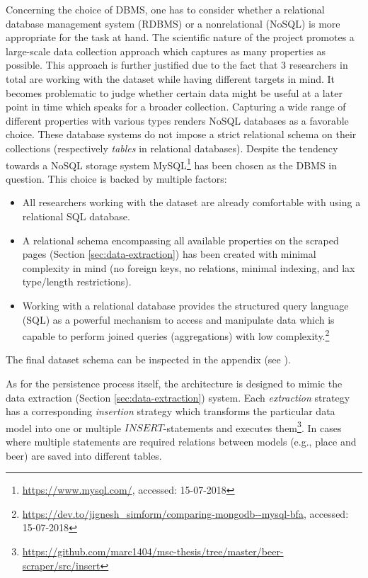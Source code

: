 Concerning the choice of DBMS, one has to consider whether a relational database management system (RDBMS)\cite{Christensson2017} or a nonrelational (NoSQL) is more appropriate for the task at hand.
The scientific nature of the project promotes a large-scale data collection approach which captures as many properties as possible.
This approach is further justified due to the fact that 3 researchers in total are working with the dataset while having different targets in mind.
It becomes problematic to judge whether certain data might be useful at a later point in time which speaks for a broader collection.
Capturing a wide range of different properties with various types renders NoSQL databases as a favorable choice.
These database systems do not impose a strict relational schema on their collections (respectively \textit{tables} in relational databases).
Despite the tendency towards a NoSQL storage system MySQL\footnote{\url{https://www.mysql.com/}, accessed: 15-07-2018} has been chosen as the DBMS in question.
This choice is backed by multiple factors:
\begin{itemize}
    \item All researchers working with the dataset are already comfortable with using a relational SQL database.
    \item A relational schema encompassing all available properties on the scraped pages (Section \ref{sec:data-extraction}) has been created with minimal complexity in mind (no foreign keys, no relations, minimal indexing, and lax type/length restrictions).
    \item Working with a relational database provides the structured query language (SQL)  as a powerful mechanism to access and manipulate data which is capable to perform joined queries (aggregations) with low complexity.\footnote{\url{https://dev.to/jignesh_simform/comparing-mongodb--mysql-bfa}, accessed: 15-07-2018}
\end{itemize}
The final dataset schema can be inspected in the appendix (see ).

As for the persistence process itself, the architecture is designed to mimic the data extraction (Section \ref{sec:data-extraction}) system.
Each \textit{extraction} strategy has a corresponding \textit{insertion} strategy which transforms the particular data model into one or multiple $INSERT$-statements and executes them\footnote{\url{https://github.com/marc1404/msc-thesis/tree/master/beer-scraper/src/insert}}.
In cases where multiple statements are required relations between models (e.g., place and beer) are saved into different tables.

